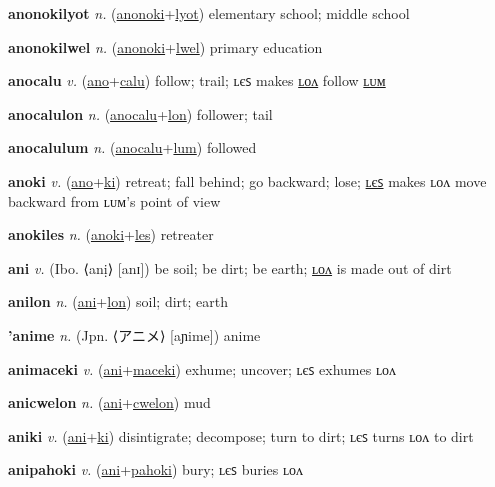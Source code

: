 \textbf{\hypertarget{anonokilyot}{anonokilyot}} \textit{n.} (\hyperlink{anonoki}{anonoki}+\allowbreak \hyperlink{lyot}{lyot})
elementary school; middle school

\textbf{\hypertarget{anonokilwel}{anonokilwel}} \textit{n.} (\hyperlink{anonoki}{anonoki}+\allowbreak \hyperlink{lwel}{lwel})
primary education

\textbf{\hypertarget{anocalu}{anocalu}} \textit{v.} (\hyperlink{ano}{ano}+\allowbreak \hyperlink{calu}{calu})
follow; trail; ʟєꜱ makes \hyperlink{anocalulon}{ʟᴏᴧ} follow \hyperlink{anocalulum}{ʟᴜᴍ}

\textbf{\hypertarget{anocalulon}{anocalulon}} \textit{n.} (\hyperlink{anocalu}{anocalu}+\allowbreak \hyperlink{lon}{lon})
follower; tail

\textbf{\hypertarget{anocalulum}{anocalulum}} \textit{n.} (\hyperlink{anocalu}{anocalu}+\allowbreak \hyperlink{lum}{lum})
followed

\textbf{\hypertarget{anoki}{anoki}} \textit{v.} (\hyperlink{ano}{ano}+\allowbreak \hyperlink{ki}{ki})
retreat; fall behind; go backward; lose; \hyperlink{anokiles}{ʟєꜱ} makes ʟᴏᴧ move backward from ʟᴜᴍ’s point of view

\textbf{\hypertarget{anokiles}{anokiles}} \textit{n.} (\hyperlink{anoki}{anoki}+\allowbreak \hyperlink{les}{les})
retreater

\textbf{\hypertarget{ani}{ani}} \textit{v.} (Ibo. ⟨anị⟩ [anɪ])
be soil; be dirt; be earth; \hyperlink{anilon}{ʟᴏᴧ} is made out of dirt

\textbf{\hypertarget{anilon}{anilon}} \textit{n.} (\hyperlink{ani}{ani}+\allowbreak \hyperlink{lon}{lon})
soil; dirt; earth

\textbf{\hypertarget{'anime}{'anime}} \textit{n.} (Jpn. ⟨{\japanese{}アニメ}⟩ [aɲime])
anime

\textbf{\hypertarget{animaceki}{animaceki}} \textit{v.} (\hyperlink{ani}{ani}+\allowbreak \hyperlink{maceki}{maceki})
exhume; uncover; ʟєꜱ exhumes ʟᴏᴧ

\textbf{\hypertarget{anicwelon}{anicwelon}} \textit{n.} (\hyperlink{ani}{ani}+\allowbreak \hyperlink{cwelon}{cwelon})
mud

\textbf{\hypertarget{aniki}{aniki}} \textit{v.} (\hyperlink{ani}{ani}+\allowbreak \hyperlink{ki}{ki})
disintigrate; decompose; turn to dirt; ʟєꜱ turns ʟᴏᴧ to dirt

\textbf{\hypertarget{anipahoki}{anipahoki}} \textit{v.} (\hyperlink{ani}{ani}+\allowbreak \hyperlink{pahoki}{pahoki})
bury; ʟєꜱ buries ʟᴏᴧ

